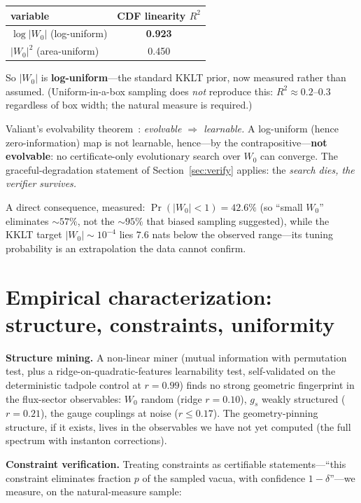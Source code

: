 \documentclass[11pt]{article}
\begin{document}
\begin{center}
\begin{tabular}{lc}
\toprule
variable & CDF linearity $R^2$ \\
\midrule
$\log|W_0|$ (log-uniform) & \textbf{0.923} \\
$|W_0|^2$ (area-uniform) & 0.450 \\
\bottomrule
\end{tabular}
\end{center}

So $|W_0|$ is \textbf{log-uniform}---the standard KKLT prior, now measured rather than
assumed. (Uniform-in-a-box sampling does \emph{not} reproduce this: $R^2 \approx
0.2$--$0.3$ regardless of box width; the natural measure is required.)

Valiant's evolvability theorem~\cite{valiant2009}: \emph{evolvable $\Rightarrow$
learnable.} A log-uniform (hence zero-information) map is not learnable, hence---by the
contrapositive---\textbf{not evolvable}: no certificate-only evolutionary search over
$W_0$ can converge. The graceful-degradation statement of Section~\ref{sec:verify}
applies: the \emph{search dies, the verifier survives.}

A direct consequence, measured: $\Pr(|W_0| < 1) = 42.6\%$ (so ``small $W_0$'' eliminates
$\sim 57\%$, not the $\sim 95\%$ that biased sampling suggested), while the KKLT target
$|W_0| \sim 10^{-4}$ lies $7.6$ nats below the observed range---its tuning probability
is an extrapolation the data cannot confirm.

\section{Empirical characterization: structure, constraints, uniformity}
\label{sec:empirical}

\textbf{Structure mining.} A non-linear miner (mutual information with permutation test,
plus a ridge-on-quadratic-features learnability test, self-validated on the
deterministic tadpole control at $r=0.99$) finds no strong geometric fingerprint in the
flux-sector observables: $W_0$ random (ridge $r=0.10$), $g_s$ weakly structured
($r=0.21$), the gauge couplings at noise ($r \le 0.17$). The geometry-pinning structure,
if it exists, lives in the observables we have not yet computed (the full spectrum with
instanton corrections).

\textbf{Constraint verification.} Treating constraints as certifiable statements---``this
constraint eliminates fraction $p$ of the sampled vacua, with confidence $1-\delta$''---we
measure, on the natural-measure sample:
\end{document}
